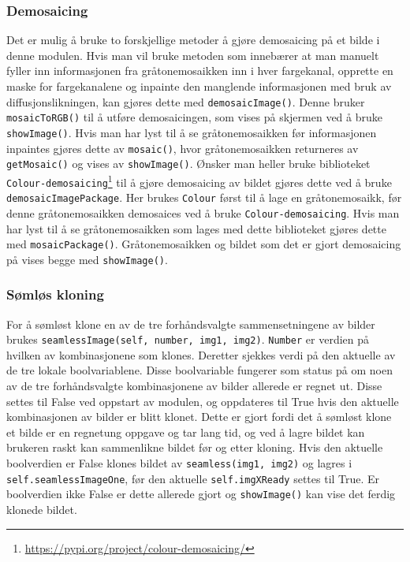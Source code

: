 \subsubsection{Demosaicing}
Det er mulig å bruke to forskjellige metoder å gjøre demosaicing på et bilde i denne modulen. Hvis man vil bruke metoden som innebærer at man manuelt fyller inn informasjonen fra gråtonemosaikken inn i hver fargekanal, opprette en maske for fargekanalene og inpainte den manglende informasjonen med bruk av diffusjonslikningen, kan gjøres dette med \texttt{demosaicImage()}. Denne bruker \texttt{mosaicToRGB()} til å utføre demosaicingen, som vises på skjermen ved å bruke \texttt{showImage()}. Hvis man har lyst til å se gråtonemosaikken før informasjonen inpaintes gjøres dette av \texttt{mosaic()}, hvor gråtonemosaikken returneres av \texttt{getMosaic()} og vises av \texttt{showImage()}. Ønsker man heller bruke biblioteket \texttt{Colour-demosaicing}\footnote{\url{https://pypi.org/project/colour-demosaicing/}} til å gjøre demosaicing av bildet gjøres dette ved å bruke \texttt{demosaicImagePackage}. Her brukes \texttt{Colour} først til å lage en gråtonemosaikk, før denne gråtonemosaikken demosaices ved å bruke \texttt{Colour-demosaicing}. Hvis man har lyst til å se gråtonemosaikken som lages med dette biblioteket gjøres dette med \texttt{mosaicPackage()}. Gråtonemosaikken og bildet som det er gjort demosaicing på vises begge med \texttt{showImage()}. 

\subsubsection{Sømløs kloning}
For å sømløst klone en av de tre forhåndsvalgte sammensetningene av bilder brukes \texttt{seamlessImage(self, number, img1, img2)}. \texttt{Number} er verdien på hvilken av kombinasjonene som klones. Deretter sjekkes verdi på den aktuelle av de tre lokale boolvariablene. Disse boolvariable fungerer som status på om noen av de tre forhåndsvalgte kombinasjonene av bilder allerede er regnet ut. Disse settes til False ved oppstart av modulen, og oppdateres til True hvis den aktuelle kombinasjonen av bilder er blitt klonet. Dette er gjort fordi det å sømløst klone et bilde er en regnetung oppgave og tar lang tid, og ved å lagre bildet kan brukeren raskt kan sammenlikne bildet før og etter kloning. Hvis den aktuelle boolverdien er False klones bildet av \texttt{seamless(img1, img2)} og lagres i \texttt{self.seamlessImageOne}, før den aktuelle \texttt{self.imgXReady} settes til True. Er boolverdien ikke False er dette allerede gjort og \texttt{showImage()} kan vise det ferdig klonede bildet. 


